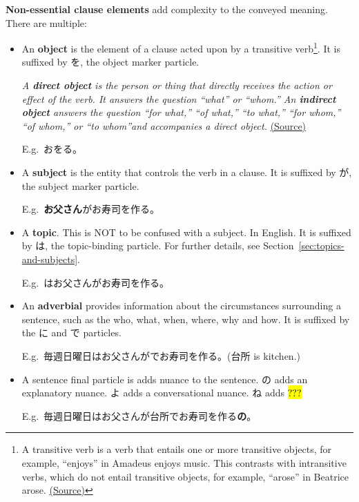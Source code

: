 \documentclass[../nihongo-gakushuu-kyouzai.tex]{subfiles}
\begin{document}
\textbf{Non-essential clause elements} add complexity to the conveyed meaning. There are multiple:
\begin{itemize}
    \item An \textbf{object} is the element of a clause acted upon by a transitive verb\footnote{A transitive verb is a verb that entails one or more transitive objects, for example, ``enjoys'' in Amadeus enjoys music. This contrasts with intransitive verbs, which do not entail transitive objects, for example, ``arose'' in Beatrice arose. \href{https://en.wikipedia.org/wiki/Transitive_verb}{(Source)}}. It is suffixed by を, the object marker particle.

    \emph{A \textbf{direct object} is the person or thing that directly receives the action or effect of the verb. It answers the question ``what'' or ``whom.'' An \textbf{indirect object} answers the question ``for what,'' ``of what,'' ``to what,'' ``for whom,'' ``of whom,'' or ``to whom''and accompanies a direct object.} \href{https://www.britannica.com/dictionary/eb/qa/Direct-and-Indirect-Objects}{(Source)}

    E.g.\ お\textbf{}をる。
    \item A \textbf{subject} is the entity that controls the verb in a clause. It is suffixed by が, the subject marker particle.

    E.g.\ \textbf{お父さん}がお寿司を作る。
    \item A \textbf{topic}. This is NOT to be confused with a subject. In English. It is suffixed by は, the topic-binding particle. For further details, see Section~\ref{sec:topics-and-subjects}.

    E.g.\ \textbf{}はお父さんがお寿司を作る。
    \item An \textbf{adverbial} provides information about the circumstances surrounding a sentence, such as the who, what, when, where, why and how. It is suffixed by the に and で particles.

    E.g.\ 毎週日曜日はお父さんが\textbf{}でお寿司を作る。(台所 is kitchen.)

    \item A sentence final particle is adds nuance to the sentence. の adds an explanatory nuance. よ adds a conversational nuance. ね adds \hl{???}

    E.g.\ 毎週日曜日はお父さんが台所でお寿司を作る\textbf{の}。
\end{itemize}
\end{document}
